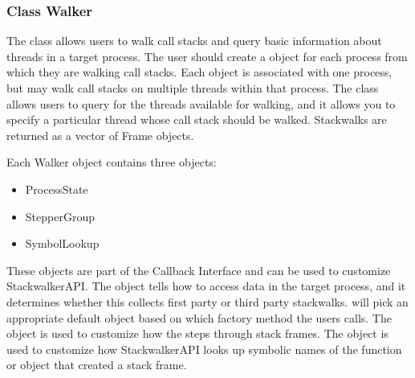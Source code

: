 \subsubsection{Class Walker}
\label{subsec:walker}

The  class allows users to walk call stacks and query basic information
about threads in a target process. The user should create a  object for
each process from which they are walking call stacks. Each  object is
associated with one process, but may walk call stacks on multiple threads within
that process. The  class allows users to query for the threads available
for walking, and it allows you to specify a particular thread whose call stack
should be walked. Stackwalks are returned as a vector of Frame objects. 

Each Walker object contains three objects: 
\begin{itemize}
    \item ProcessState
    \item StepperGroup
    \item SymbolLookup
\end{itemize}

These objects are part of the Callback Interface and can be used to customize
StackwalkerAPI. The  object tells  how to access data in the
target process, and it determines whether this  collects first party or
third party stackwalks.  will pick an appropriate default 
object based on which factory method the users calls. The  object is
used to customize how the  steps through stack frames. The
object is used to customize how StackwalkerAPI looks up symbolic names of the
function or object that created a stack frame.

